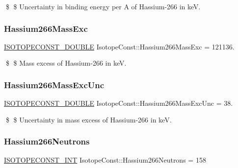 \$ \$ Uncertainty in binding energy per A of Hassium-\/266 in keV. \mbox{\label{group___isotope_const-_hassium-_hs266_gad8f81280425aabe3252cc8cb4fad2ba0}} 
\subsubsection{\texorpdfstring{Hassium266\+Mass\+Exc}{Hassium266MassExc}}
{\footnotesize\ttfamily \mbox{\hyperlink{group___isotope_const-_macros_ga8f45a7272ce02c0b4c65c44636ed719a}{I\+S\+O\+T\+O\+P\+E\+C\+O\+N\+S\+T\+\_\+\+D\+O\+U\+B\+LE}} Isotope\+Const\+::\+Hassium266\+Mass\+Exc = 121136.}

\$ \$ Mass excess of Hassium-\/266 in keV. \mbox{\label{group___isotope_const-_hassium-_hs266_gabe425c3de8a784ce6805ec6dc2f9eefa}} 
\subsubsection{\texorpdfstring{Hassium266\+Mass\+Exc\+Unc}{Hassium266MassExcUnc}}
{\footnotesize\ttfamily \mbox{\hyperlink{group___isotope_const-_macros_ga8f45a7272ce02c0b4c65c44636ed719a}{I\+S\+O\+T\+O\+P\+E\+C\+O\+N\+S\+T\+\_\+\+D\+O\+U\+B\+LE}} Isotope\+Const\+::\+Hassium266\+Mass\+Exc\+Unc = 38.}

\$ \$ Uncertainty in mass excess of Hassium-\/266 in keV. \mbox{\label{group___isotope_const-_hassium-_hs266_ga16fa44f374bd7fd018a875c73c6335da}} 
\subsubsection{\texorpdfstring{Hassium266\+Neutrons}{Hassium266Neutrons}}
{\footnotesize\ttfamily \mbox{\hyperlink{group___isotope_const-_macros_ga5f18360b3e99483a35c32d789e62621c}{I\+S\+O\+T\+O\+P\+E\+C\+O\+N\+S\+T\+\_\+\+I\+NT}} Isotope\+Const\+::\+Hassium266\+Neutrons = 158}

